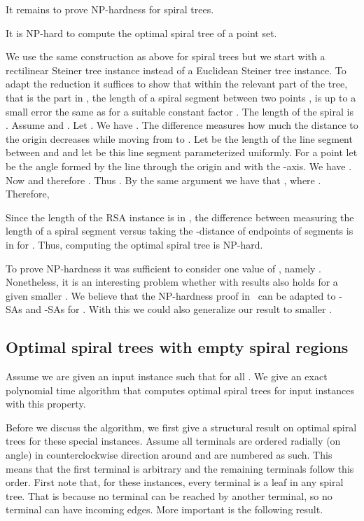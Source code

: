 \documentclass{journalA4}
\begin{document}
It remains to prove NP-hardness for spiral trees.
\begin{theorem}\label{thm:nphard-spiral}
It is NP-hard to compute the optimal spiral tree of a point set.
\end{theorem}
We use the same construction as above for spiral trees but we start with a rectilinear Steiner tree instance instead of a Euclidean Steiner tree instance. To adapt the reduction it suffices to show that within the relevant part of the tree, that is the part in , the length of a spiral segment between two points ,  is up to a small error the same as  for a suitable constant factor . The length of the spiral is . Assume  and . Let . We have . The difference  measures how much the distance to the origin decreases while moving from  to . Let  be the length of the line segment between  and  and let  be this line segment parameterized uniformly. For a point  let  be the angle formed by the line through the origin and  with the -axis. We have . Now  and therefore . Thus . By the same argument we have that , where . Therefore,

Since the length of the RSA instance is in , the difference between measuring the length of a spiral segment versus taking the -distance of endpoints of segments is in  for . Thus, computing the optimal spiral tree is NP-hard.
\hfill\QED
\medskip

To prove NP-hardness it was sufficient to consider one value of , namely . Nonetheless, it is an interesting problem whether with results also holds for a given smaller . We believe that the NP-hardness proof in~\cite{ss-rsap-05} can be adapted to -SAs and -SAs for . With this we could also generalize our result to smaller .

\subsection{Optimal spiral trees with empty spiral regions} \label{sec:emptyregions}

Assume we are given an input instance such that  for all . We give an exact polynomial time algorithm that computes optimal spiral trees for input instances with this property.

Before we discuss the algorithm, we first give a structural result on optimal spiral trees for these special instances. Assume all terminals are ordered radially (on angle) in counterclockwise direction around  and are numbered as such. This means that the first terminal  is arbitrary and the remaining terminals  follow this order. First note that, for these instances, every terminal is a leaf in any spiral tree. That is because no terminal can be reached by another terminal, so no terminal can have incoming edges. More important is the following result.
\end{document}
